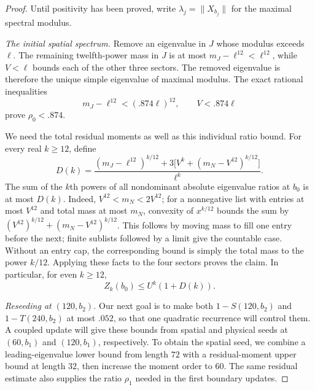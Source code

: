 \begin{proof}
Until positivity has been proved, write $\lambda_j=\|X_{b_j}\|$ for
the maximal spectral modulus.

\emph{The initial spatial spectrum.}
Remove an eigenvalue in $J$ whose modulus exceeds $\ell$.
The remaining twelfth-power mass in $J$ is at most
$m_J-\ell^{12}<\ell^{12}$, while $V<\ell$ bounds each of the other
three sectors.  The removed eigenvalue is therefore the unique simple
eigenvalue of maximal modulus.  The exact rational inequalities
\[
 m_J-\ell^{12}<(.874\ell)^{12},\qquad V<.874\ell
\]
prove $\rho_0<.874$.

We need the total residual moments as well as this individual ratio
bound.  For every real $k\ge12$, define
\begin{equation}\label{per:D}
 D(k)=\frac{(m_J-\ell^{12})^{k/12}
       +3\bigl[V^k+(m_N-V^{12})^{k/12}\bigr]}{\ell^k}.
\end{equation}
The sum of the $k$th powers of all nondominant absolute eigenvalue
ratios at $b_0$ is at most $D(k)$.  Indeed,
$V^{12}<m_N<2V^{12}$; for a nonnegative list with entries at most
$V^{12}$ and total mass at most $m_N$, convexity of $x^{k/12}$ bounds
the sum by $(V^{12})^{k/12}+(m_N-V^{12})^{k/12}$.  This follows by
moving mass to fill one entry before the next; finite sublists followed
by a limit give the countable case.  Without an entry cap, the
corresponding bound is simply the total mass to the power $k/12$.
Applying these facts to the four sectors proves the claim.  In
particular, for even $k\ge12$,
\begin{equation}\label{per:Z-initial}
 Z_k(b_0)\le U^k(1+D(k)).
\end{equation}

\emph{Reseeding at $(120,b_2)$.}
Our next goal is to make both $1-S(120,b_2)$ and $1-T(240,b_2)$
at most $.052$, so that one quadratic recurrence will control them.
A coupled update will give these bounds from spatial and physical
seeds at $(60,b_1)$ and $(120,b_1)$, respectively. To obtain the
spatial seed, we combine a leading-eigenvalue lower bound from length
$72$ with a residual-moment upper bound at length $32$, then increase
the moment order to $60$. The same residual estimate also supplies
the ratio $\rho_1$ needed in the first boundary updates.


\end{proof}

